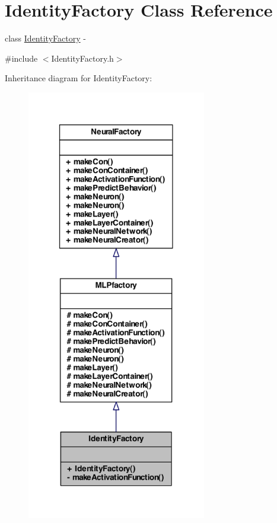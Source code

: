 \hypertarget{class_identity_factory}{
\section{IdentityFactory Class Reference}
\label{class_identity_factory}
}


class \hyperlink{class_identity_factory}{IdentityFactory} -\/  




{\ttfamily \#include $<$IdentityFactory.h$>$}



Inheritance diagram for IdentityFactory:\nopagebreak
\begin{figure}[H]
\begin{center}
\leavevmode
\includegraphics[width=222pt]{class_identity_factory__inherit__graph}
\end{center}
\end{figure}


